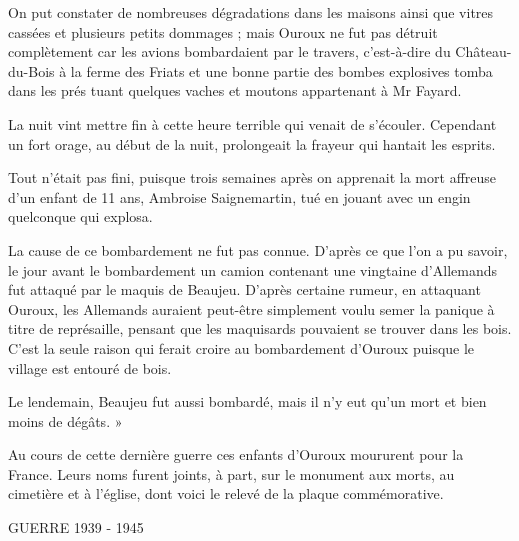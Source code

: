 On put constater de nombreuses dégradations dans les maisons ainsi que vitres cassées et plusieurs petits dommages ; mais Ouroux ne fut pas détruit complètement car les avions bombardaient par le travers, c'est-à-dire du Château-du-Bois à la ferme des Friats et une bonne partie des bombes explosives tomba dans les prés tuant quelques vaches et moutons appartenant à Mr Fayard.

La nuit vint mettre fin à cette heure terrible qui venait de s'écouler. Cependant un fort orage, au début de la nuit, prolongeait la frayeur qui hantait les esprits.

Tout n'était pas fini, puisque trois semaines après on apprenait la mort affreuse d'un enfant de 11 ans, Ambroise Saignemartin, tué en jouant avec un engin quelconque qui explosa.

La cause de ce bombardement ne fut pas connue. D'après ce que l'on a pu savoir, le jour avant le bombardement un camion contenant une vingtaine d'Allemands fut attaqué par le maquis de Beaujeu. D'après certaine rumeur, en attaquant Ouroux, les Allemands auraient peut-être simplement voulu semer la panique à titre de représaille, pensant que les maquisards pouvaient se trouver dans les bois. C'est la seule raison qui ferait croire au bombardement d'Ouroux puisque le village est entouré de bois.

Le lendemain, Beaujeu fut aussi bombardé, mais il n'y eut qu'un mort et bien moins de dégâts. »

Au cours de cette dernière guerre ces enfants d'Ouroux moururent pour la France. Leurs noms furent joints, à part, sur le monument aux morts, au cimetière et à l'église, dont voici le relevé de la plaque commémorative.

\begin{center}
\setlength{\fboxsep}{6pt}
\end{center}
\iffalse
GUERRE 1939 - 1945

